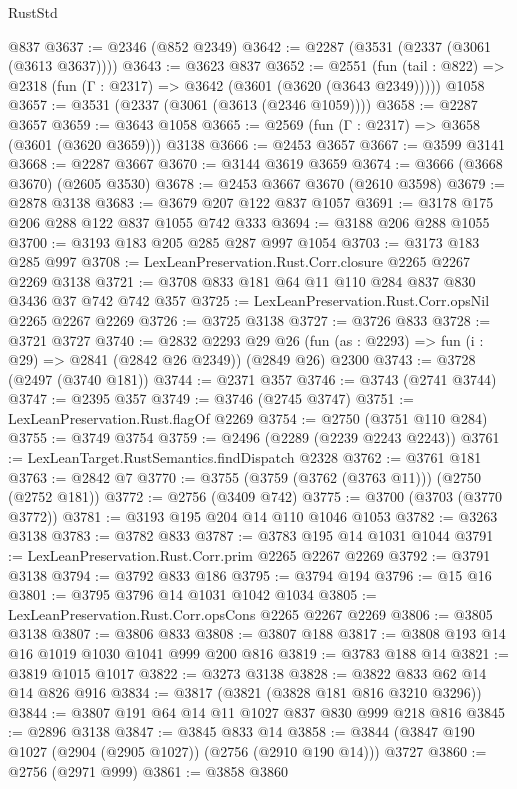 \begin{lexlean}{RustStd}
\begin{coremodule}
    @837
@3637 := @2346 (@852 @2349)
@3642 := @2287 (@3531 (@2337 (@3061 (@3613 @3637))))
@3643 := @3623 @837
@3652 := @2551
    (fun (tail : @822) => @2318 (fun (Γ : @2317) => @3642 (@3601 (@3620 (@3643 @2349)))))
    @1058
@3657 := @3531 (@2337 (@3061 (@3613 (@2346 @1059))))
@3658 := @2287 @3657
@3659 := @3643 @1058
@3665 := @2569 (fun (Γ : @2317) => @3658 (@3601 (@3620 @3659))) @3138
@3666 := @2453 @3657
@3667 := @3599 @3141
@3668 := @2287 @3667
@3670 := @3144 @3619 @3659
@3674 := @3666 (@3668 @3670) (@2605 @3530)
@3678 := @2453 @3667 @3670 (@2610 @3598)
@3679 := @2878 @3138
@3683 := @3679 @207 @122 @837 @1057
@3691 := @3178 @175 @206 @288 @122 @837 @1055 @742 @333
@3694 := @3188 @206 @288 @1055
@3700 := @3193 @183 @205 @285 @287 @997 @1054
@3703 := @3173 @183 @285 @997
@3708 := LexLeanPreservation.Rust.Corr.closure @2265 @2267 @2269 @3138
@3721 := @3708 @833 @181 @64 @11 @110 @284 @837 @830 @3436 @37 @742 @742 @357
@3725 := LexLeanPreservation.Rust.Corr.opsNil @2265 @2267 @2269
@3726 := @3725 @3138
@3727 := @3726 @833
@3728 := @3721 @3727
@3740 := @2832
    @2293
    @29
    @26
    (fun (as : @2293) => fun (i : @29) => @2841 (@2842 @26 @2349))
    (@2849 @26)
    @2300
@3743 := @3728 (@2497 (@3740 @181))
@3744 := @2371 @357
@3746 := @3743 (@2741 @3744)
@3747 := @2395 @357
@3749 := @3746 (@2745 @3747)
@3751 := LexLeanPreservation.Rust.flagOf @2269
@3754 := @2750 (@3751 @110 @284)
@3755 := @3749 @3754
@3759 := @2496 (@2289 (@2239 @2243 @2243))
@3761 := LexLeanTarget.RustSemantics.findDispatch @2328
@3762 := @3761 @181
@3763 := @2842 @7
@3770 := @3755 (@3759 (@3762 (@3763 @11))) (@2750 (@2752 @181))
@3772 := @2756 (@3409 @742)
@3775 := @3700 (@3703 (@3770 @3772))
@3781 := @3193 @195 @204 @14 @110 @1046 @1053
@3782 := @3263 @3138
@3783 := @3782 @833
@3787 := @3783 @195 @14 @1031 @1044
@3791 := LexLeanPreservation.Rust.Corr.prim @2265 @2267 @2269
@3792 := @3791 @3138
@3794 := @3792 @833 @186
@3795 := @3794 @194
@3796 := @15 @16
@3801 := @3795 @3796 @14 @1031 @1042 @1034
@3805 := LexLeanPreservation.Rust.Corr.opsCons @2265 @2267 @2269
@3806 := @3805 @3138
@3807 := @3806 @833
@3808 := @3807 @188
@3817 := @3808 @193 @14 @16 @1019 @1030 @1041 @999 @200 @816
@3819 := @3783 @188 @14
@3821 := @3819 @1015 @1017
@3822 := @3273 @3138
@3828 := @3822 @833 @62 @14 @14 @826 @916
@3834 := @3817 (@3821 (@3828 @181 @816 @3210 @3296))
@3844 := @3807 @191 @64 @14 @11 @1027 @837 @830 @999 @218 @816
@3845 := @2896 @3138
@3847 := @3845 @833 @14
@3858 := @3844 (@3847 @190 @1027 (@2904 (@2905 @1027)) (@2756 (@2910 @190 @14))) @3727
@3860 := @2756 (@2971 @999)
@3861 := @3858 @3860

\end{coremodule}
\end{lexlean}
